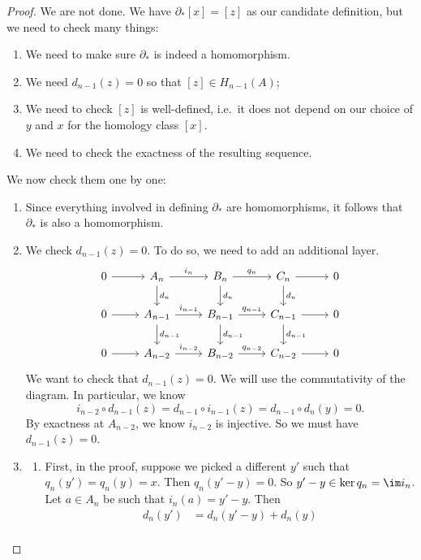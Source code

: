 \documentclass[a4paper]{article}
\theoremstyle{definition}
\begin{document}
\begin{proof}
  We are not done. We have $\partial_* [x] = [z]$ as our candidate definition, but we need to check many things:
  \begin{enumerate}
    \item We need to make sure $\partial_*$ is indeed a homomorphism.
    \item We need $d_{n - 1}(z) = 0$ so that $[z] \in H_{n - 1}(A)$;
    \item We need to check $[z]$ is well-defined, i.e.\ it does not depend on our choice of $y$ and $x$ for the homology class $[x]$.
    \item We need to check the exactness of the resulting sequence.
  \end{enumerate}
  We now check them one by one:
  \begin{enumerate}
    \item Since everything involved in defining $\partial_*$ are homomorphisms, it follows that $\partial_*$ is also a homomorphism.
    \item We check $d_{n - 1}(z) = 0$. To do so, we need to add an additional layer.
      \[
        \begin{tikzcd}
          0 \ar[r] & A_n \ar[r, "i_n"] \ar[d, "d_n"] & B_n \ar[r, "q_n"] \ar[d, "d_n"] & C_n \ar[r] \ar[d, "d_n"] & 0\\
          0 \ar[r] & A_{n - 1} \ar[r, "i_{n - 1}"] \ar[d, "d_{n - 1}"] & B_{n - 1} \ar[r, "q_{n - 1}"] \ar[d, "d_{n - 1}"] & C_{n - 1} \ar[r] \ar[d, "d_{n - 1}"] & 0\\
          0 \ar[r] & A_{n - 2} \ar[r, "i_{n - 2}"] & B_{n - 2} \ar[r, "q_{n - 2}"] & C_{n - 2} \ar[r] & 0
        \end{tikzcd}
      \]
      We want to check that $d_{n - 1}(z) = 0$. We will use the commutativity of the diagram. In particular, we know
      \[
        i_{n - 2} \circ d_{n - 1}(z) = d_{n - 1} \circ i_{n - 1} (z) = d_{n - 1} \circ d_n(y) = 0.
      \]
      By exactness at $A_{n - 2}$, we know $i_{n - 2}$ is injective. So we must have $d_{n - 1}(z) = 0$.
    \item
      \begin{enumerate}
        \item First, in the proof, suppose we picked a different $y'$ such that $q_n(y') = q_n(y) = x$. Then $q_n(y' - y) = 0$. So $y' - y \in \ker q_n = \im i_n$. Let $a \in A_n$ be such that $i_n(a) = y' - y$. Then
          \begin{align*}
            d_n(y') &= d_n(y' - y) + d_n(y) \\

\end{align*}
\end{enumerate}
\end{enumerate}
\end{proof}
\end{document}
